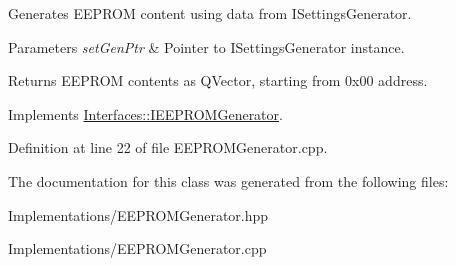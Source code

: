 Generates E\+E\+P\+R\+OM content using data from I\+Settings\+Generator. 


\begin{DoxyParams}{Parameters}
{\em set\+Gen\+Ptr} & Pointer to I\+Settings\+Generator instance. \\
\hline
\end{DoxyParams}
\begin{DoxyReturn}{Returns}
E\+E\+P\+R\+OM contents as Q\+Vector, starting from 0x00 address. 
\end{DoxyReturn}


Implements \hyperlink{class_interfaces_1_1_i_e_e_p_r_o_m_generator_a9d248220e0f557cf6c6b450ed84281dd}{Interfaces\+::\+I\+E\+E\+P\+R\+O\+M\+Generator}.



Definition at line 22 of file E\+E\+P\+R\+O\+M\+Generator.\+cpp.



The documentation for this class was generated from the following files\+:\begin{DoxyCompactItemize}
\item 
Implementations/E\+E\+P\+R\+O\+M\+Generator.\+hpp\item 
Implementations/E\+E\+P\+R\+O\+M\+Generator.\+cpp\end{DoxyCompactItemize}
